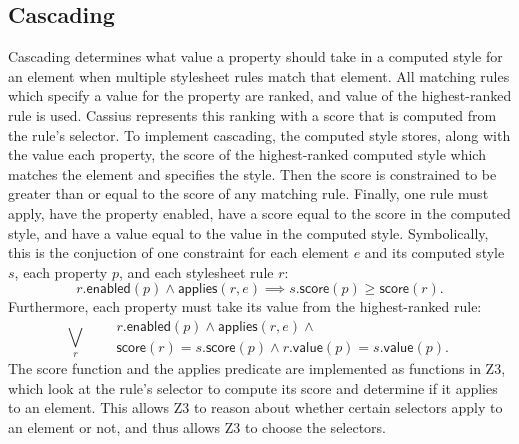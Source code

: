 \documentclass[10pt]{sigplanconf}
\newcommand{\name}{Cassius\xspace}
\begin{document}
\subsection{Cascading}
Cascading determines
  what value a property should take in a computed style for an element
  when multiple stylesheet rules match that element.
All matching rules which specify a value for the property are ranked,
  and value of the highest-ranked rule is used.
\name represents this ranking with a score
  that is computed from the rule's selector.
To implement cascading,
  the computed style stores, along with the value each property,
  the score of the highest-ranked computed style
  which matches the element
  and specifies the style.
Then the score is constrained to be greater than or equal
  to the score of any matching rule.
Finally, one rule must apply,
  have the property enabled,
  have a score equal to the score in the computed style,
  and have a value equal to the value in the computed style.
Symbolically, this is the conjuction of one constraint
  for each element $e$ and its computed style $s$,
  each property $p$,
  and each stylesheet rule $r$:
\[
r.\mathsf{enabled}(p) \land
\mathsf{applies}(r, e) \implies
s.\mathsf{score}(p) \ge \mathsf{score}(r).
\]
Furthermore, each property must take its value
  from the highest-ranked rule:
\[
\bigvee_{r} \quad
\begin{align*}
& r.\mathsf{enabled}(p) \land \mathsf{applies}(r, e) \land \\
& \mathsf{score}(r) = s.\mathsf{score}(p) \land r.\mathsf{value}(p) = s.\mathsf{value}(p).
\end{align*}
\]
The \textsf{score} function and the \textsf{applies} predicate
  are implemented as functions in Z3,
  which look at the rule's selector
  to compute its score and determine if it applies to an element.
This allows Z3 to reason about
  whether certain selectors apply to an element or not,
  and thus allows Z3 to choose the selectors.
\end{document}
